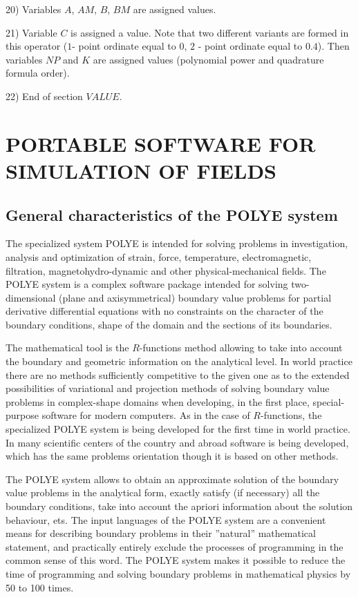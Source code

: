 20) Variables $A$, $AM$, $B$, $BM$ are assigned values.

21) Variable $C$ is assigned a value. Note that two different variants are
formed in this operator ($1$- point ordinate equal to $0$, $2$ - point
ordinate equal to $0.4$). Then variables $NP$ and $K$ are assigned values
(polynomial power and quadrature formula order).

22) End of section $VALUE$.

\chapter{ PORTABLE SOFTWARE FOR SIMULATION OF FIELDS}

\section{General characteristics of the POLYE system}

The specialized system POLYE is intended for solving problems in
investigation, analysis and optimization of strain, force, temperature,
electromagnetic, filtration, magnetohydro-dynamic and other
physical-mechanical fields. The POLYE system is a complex software package
intended for solving two-dimensional (plane and axisymmetrical) boundary
value problems for partial derivative differential equations with no
constraints on the character of the boundary conditions, shape of the domain
and the sections of its boundaries.

The mathematical tool is the $R$-functions method allowing to take into
account the boundary and geometric information on the analytical level. In
world practice there are no methods sufficiently competitive to the given
one as to the extended possibilities of variational and projection methods
of solving boundary value problems in complex-shape domains when developing,
in the first place, special-purpose software for modern computers. As in the
case of $R$-functions, the specialized POLYE system is being developed for
the first time in world practice. In many scientific centers of the country
and abroad software is being developed, which has the same problems
orientation though it is based on other methods.

The POLYE system allows to obtain an approximate solution of the boundary
value problems in the analytical form, exactly satisfy (if necessary) all
the boundary conditions, take into account the apriori information about the
solution behaviour, ets. The input languages of the POLYE system are a
convenient means for describing boundary problems in their ''natural''
mathematical statement, and practically entirely exclude the processes of
programming in the common sense of this word. The POLYE system makes it
possible to reduce the time of programming and solving boundary problems in
mathematical physics by 50 to 100 times.

